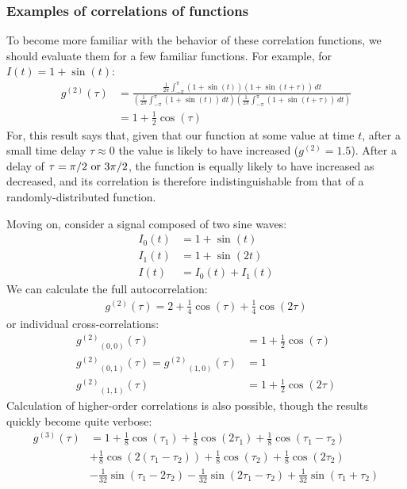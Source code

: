 \documentclass{article}
\newcommand{\gn}[1]{\ensuremath{g^{(#1)}}}
\begin{document}
\subsubsection{Examples of correlations of functions}
To become more familiar with the behavior of these correlation functions, we should evaluate them for a few familiar functions. For example, for $I(t)=1+\sin{(t)}$:
\begin{align}
\label{eq:sine_correlation}
\gn{2}(\tau) &= \frac{\frac{1}{2\pi}\int_{-\pi}^{\pi}{\left(1+\sin{(t)}\right)\left(1+\sin{(t+\tau)}\right)\,dt}}
                     {\left(\frac{1}{2\pi}\int_{-\pi}^{\pi}{\left(1+\sin{(t)}\right)\,dt}\right)
                      \left(\frac{1}{2\pi}\int_{-\pi}^{\pi}{\left(1+\sin{(t+\tau)}\right)\,dt}\right)} \\
             &= 1 + \frac{1}{2}\cos{(\tau)}
\end{align}
For, this result says that, given that our function at some value at time $t$, after a small time delay $\tau\approx 0$ the value is likely to have increased ($\gn{2}=1.5$). After a delay of $\tau=\pi/2\textnormal{ or }3\pi/2$, the function is equally likely to have increased as decreased, and its correlation is therefore indistinguishable from that of a randomly-distributed function.

Moving on, consider a signal composed of two sine waves:
\begin{align}
I_{0}(t) &= 1+\sin(t) \\
I_{1}(t) &= 1+\sin(2t) \\
I(t) &= I_{0}(t)+I_{1}(t)
\end{align}
We can calculate the full autocorrelation:
\begin{align}
\gn{2}(\tau) = 2 + \frac{1}{4}\cos(\tau) + \frac{1}{4}\cos(2\tau)
\end{align}
or individual cross-correlations:
\begin{align}
\gn{2}_{(0,0)}(\tau) &= 1+\frac{1}{2}\cos(\tau) \\
\gn{2}_{(0,1)}(\tau) = \gn{2}_{(1,0)}(\tau) &= 1 \\
\gn{2}_{(1,1)}(\tau) &= 1+\frac{1}{2}\cos(2\tau)
\end{align}
Calculation of higher-order correlations is also possible, though the results quickly become quite verbose:
\begin{align}
\gn{3}(\tau) &= 1
               + \frac{1}{8}\cos(\tau_{1})
               + \frac{1}{8}\cos(2\tau_{1})
               + \frac{1}{8}\cos(\tau_{1}-\tau_{2}) \nonumber\\
            &  + \frac{1}{8}\cos(2(\tau_{1}-\tau_{2}))
               + \frac{1}{8}\cos(\tau_{2})
               + \frac{1}{8}\cos(2\tau_{2})  \nonumber \\
            &  - \frac{1}{32}\sin(\tau_{1}-2\tau_{2})
               - \frac{1}{32}\sin(2\tau_{1}-\tau_{2})
               + \frac{1}{32}\sin(\tau_{1}+\tau_{2})
\end{align}
\end{document}
